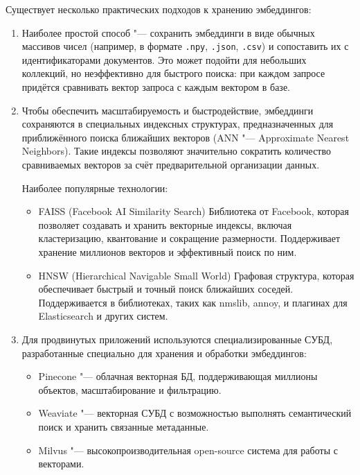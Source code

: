 \documentclass[coursework]{SCWorks}
\begin{document}
Существует несколько практических подходов к хранению эмбеддингов:
\begin{enumerate}
    \item
Наиболее простой способ "--- сохранить эмбеддинги в виде обычных массивов чисел (например, в формате \verb|.npy|, \verb|.json|, \verb|.csv|) и сопоставить их с идентификаторами документов. Это может подойти для небольших коллекций, но неэффективно для быстрого поиска: при каждом запросе придётся сравнивать вектор запроса с каждым вектором в базе.

    \item Чтобы обеспечить масштабируемость и быстродействие, эмбеддинги сохраняются в специальных индексных структурах, предназначенных для приближённого поиска ближайших векторов (ANN "--- Approximate Nearest Neighbors). Такие индексы позволяют значительно сократить количество сравниваемых векторов за счёт предварительной организации данных.

Наиболее популярные технологии:
\begin{itemize}
    \item 
    FAISS (Facebook AI Similarity Search)
    Библиотека от Facebook, которая позволяет создавать и хранить векторные индексы, включая кластеризацию, квантование и сокращение размерности. Поддерживает хранение миллионов векторов и эффективный поиск по ним.

    \item HNSW (Hierarchical Navigable Small World)
    Графовая структура, которая обеспечивает быстрый и точный поиск ближайших соседей. Поддерживается в библиотеках, таких как nmslib, annoy, и плагинах для Elasticsearch и других систем.
\end{itemize}

    \item Для продвинутых приложений используются специализированные СУБД, разработанные специально для хранения и обработки эмбеддингов:
    \begin{itemize}
        \item 
        Pinecone "--- облачная векторная БД, поддерживающая миллионы объектов, масштабирование и фильтрацию.

        \item Weaviate "--- векторная СУБД с возможностью выполнять семантический поиск и хранить связанные метаданные.

        \item Milvus "--- высокопроизводительная open-source система для работы с векторами.
        \end{itemize}
\end{enumerate}
\end{document}
